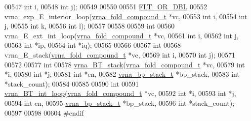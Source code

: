 \begin{DoxyCode}
00547                     \textcolor{keywordtype}{int}                   i,
00548                     \textcolor{keywordtype}{int}                   j);
00549 
00550 
00551 \hyperlink{group__data__structures_ga31125aeace516926bf7f251f759b6126}{FLT\_OR\_DBL}
00552 vrna\_exp\_E\_interior\_loop(\hyperlink{group__fold__compound_structvrna__fc__s}{vrna\_fold\_compound\_t} *vc,
00553                          \textcolor{keywordtype}{int}                  i,
00554                          \textcolor{keywordtype}{int}                  j,
00555                          \textcolor{keywordtype}{int}                  k,
00556                          \textcolor{keywordtype}{int}                  l);
00557 
00558 
00559 \textcolor{keywordtype}{int}
00560 vrna\_E\_ext\_int\_loop(\hyperlink{group__fold__compound_structvrna__fc__s}{vrna\_fold\_compound\_t}  *vc,
00561                     \textcolor{keywordtype}{int}                   i,
00562                     \textcolor{keywordtype}{int}                   j,
00563                     \textcolor{keywordtype}{int}                   *ip,
00564                     \textcolor{keywordtype}{int}                   *iq);
00565 
00566 
00567 \textcolor{keywordtype}{int}
00568 vrna\_E\_stack(\hyperlink{group__fold__compound_structvrna__fc__s}{vrna\_fold\_compound\_t} *vc,
00569              \textcolor{keywordtype}{int}                  i,
00570              \textcolor{keywordtype}{int}                  j);
00571 
00572 
00577 \textcolor{keywordtype}{int}
00578 \hyperlink{group__loops_gad320d5d721e33bed120168213d8f45e5}{vrna\_BT\_stack}(\hyperlink{group__fold__compound_structvrna__fc__s}{vrna\_fold\_compound\_t}  *vc,
00579               \textcolor{keywordtype}{int}                   *i,
00580               \textcolor{keywordtype}{int}                   *j,
00581               \textcolor{keywordtype}{int}                   *en,
00582               \hyperlink{group__data__structures_structvrna__bp__stack__s}{vrna\_bp\_stack\_t}       *bp\_stack,
00583               \textcolor{keywordtype}{int}                   *stack\_count);
00584 
00585 
00590 \textcolor{keywordtype}{int}
00591 \hyperlink{group__loops_ga849b7dc373b6c0b029672e16a7e52053}{vrna\_BT\_int\_loop}(\hyperlink{group__fold__compound_structvrna__fc__s}{vrna\_fold\_compound\_t} *vc,
00592                  \textcolor{keywordtype}{int}                  *i,
00593                  \textcolor{keywordtype}{int}                  *j,
00594                  \textcolor{keywordtype}{int}                  en,
00595                  \hyperlink{group__data__structures_structvrna__bp__stack__s}{vrna\_bp\_stack\_t}      *bp\_stack,
00596                  \textcolor{keywordtype}{int}                  *stack\_count);
00597 
00598 
00604 \textcolor{preprocessor}{#endif}
\end{DoxyCode}
